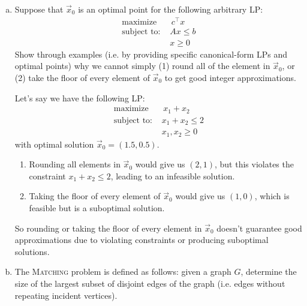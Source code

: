 \documentclass[11pt]{article}
\begin{document}
\begin{enumerate}[(a)]
    \item Suppose that $\vec{x}_0$ is an optimal point for the following arbitrary LP:
    \begin{align*}
        \text{maximize } &\, c^\top x \\
        \text{subject to: }& Ax\le b \\
        & x\ge 0
    \end{align*} Show through examples (i.e. by providing specific canonical-form LPs and optimal points) why we cannot simply (1) round all of the element in $\vec{x}_0$, or (2) take the floor of every element of $\vec{x}_0$ to get good integer approximations.\\
    \begin{solution}
        Let's say we have the following LP:
        \[
        \begin{aligned}
        \text{maximize } &\, x_1 + x_2 \\
        \text{subject to: } & x_1 + x_2 \leq 2 \\
        & x_1, x_2 \geq 0
        \end{aligned}
        \]
        with optimal solution $\vec{x}_0 = (1.5, 0.5)$.

        \begin{enumerate}[(1)]
            \item Rounding all elements in $\vec{x}_0$ would give us $(2, 1)$, but this violates the constraint $x_1 + x_2 \leq 2$, leading to an infeasible solution.            
            \item Taking the floor of every element of $\vec{x}_0$ would give us $(1, 0)$, which is feasible but is a suboptimal solution. 
        \end{enumerate}

        So rounding or taking the floor of every element in $\vec{x}_0$ doesn't guarantee good approximations due to violating constraints or producing suboptimal solutions.
    \end{solution}
    \item The \textsc{Matching} problem is defined as follows: given a graph $G$, determine the size of the largest subset of disjoint edges of the graph (i.e. edges without repeating incident vertices).


\end{enumerate}
\end{document}
